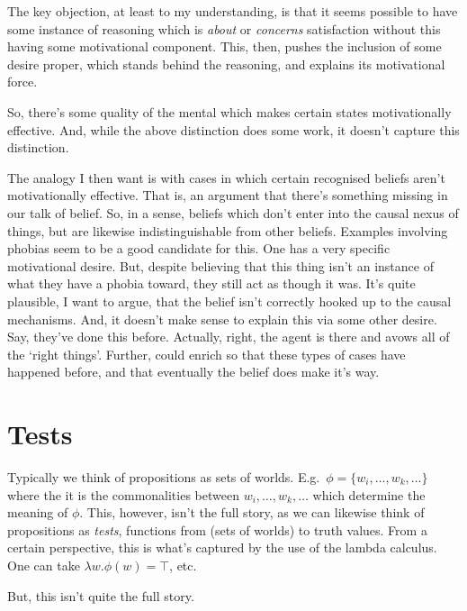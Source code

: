 \documentclass[10pt]{article}
\begin{document}
The key objection, at least to my understanding, is that it seems possible to have some instance of reasoning which is \emph{about} or \emph{concerns} satisfaction without this having some motivational component.
This, then, pushes the inclusion of some desire proper, which stands behind the reasoning, and explains its motivational force.

So, there's some quality of the mental which makes certain states motivationally effective.
And, while the above distinction does some work, it doesn't capture this distinction.

The analogy I then want is with cases in which certain recognised beliefs aren't motivationally effective.
That is, an argument that there's something missing in our talk of belief.
So, in a sense, beliefs which don't enter into the causal nexus of things, but are likewise indistinguishable from other beliefs.
Examples involving phobias seem to be a good candidate for this.
One has a very specific motivational desire.
But, despite believing that this thing isn't an instance of what they have a phobia toward, they still act as though it was.
It's quite plausible, I want to argue, that the belief isn't correctly hooked up to the causal mechanisms.
And, it doesn't make sense to explain this via some other desire.
Say, they've done this before.
Actually, right, the agent is there and avows all of the `right things'.
Further, could enrich so that these types of cases have happened before, and that eventually the belief does make it's way.





\section{Tests}
\label{sec:tests}

Typically we think of propositions as sets of worlds.
E.g.\ \(\phi = \{w_{i}, \dots, w_{k}, \dots\}\) where the it is the commonalities between \(w_{i}, \dots, w_{k}, \dots\) which determine the meaning of \(\phi\).
This, however, isn't the full story, as we can likewise think of propositions as \emph{tests}, functions from (sets of worlds) to truth values.
From a certain perspective, this is what's captured by the use of the lambda calculus.
One can take \(\lambda w.\phi(w) = \top\), etc.\

But, this isn't quite the full story.
\end{document}

